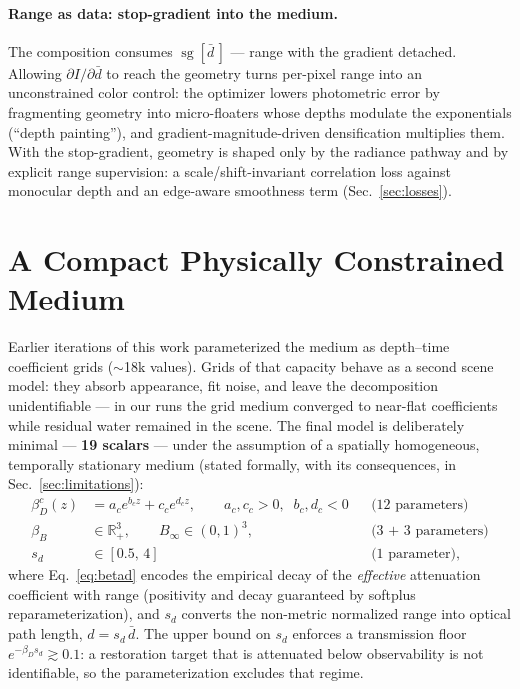 \documentclass[11pt,a4paper]{article}
\newcommand{\Binf}{B_\infty}
\newcommand{\I}{I}
\newcommand{\sg}{\operatorname{sg}}
\begin{document}
\paragraph{Range as data: stop-gradient into the medium.}
The composition consumes $\sg[\bar d\,]$ --- range with the gradient detached. Allowing $\partial \I / \partial \bar d$ to reach the geometry turns per-pixel range into an unconstrained color control: the optimizer lowers photometric error by fragmenting geometry into micro-floaters whose depths modulate the exponentials (``depth painting''), and gradient-magnitude-driven densification multiplies them. With the stop-gradient, geometry is shaped only by the radiance pathway and by explicit range supervision: a scale/shift-invariant correlation loss against monocular depth and an edge-aware smoothness term (Sec.~\ref{sec:losses}).

\section{A Compact Physically Constrained Medium}
\label{sec:medium-param}

Earlier iterations of this work parameterized the medium as depth--time coefficient grids ($\sim$18k values). Grids of that capacity behave as a second scene model: they absorb appearance, fit noise, and leave the decomposition unidentifiable --- in our runs the grid medium converged to near-flat coefficients while residual water remained in the scene. The final model is deliberately minimal --- \textbf{19 scalars} --- under the assumption of a spatially homogeneous, temporally stationary medium (stated formally, with its consequences, in Sec.~\ref{sec:limitations}):
\begin{align}
    \beta_D^c(z) &= a_c e^{b_c z} + c_c e^{d_c z},
    \qquad a_c, c_c > 0,\;\; b_c, d_c < 0
    && \text{(12 parameters)} \label{eq:betad}\\
    \beta_B &\in \mathbb{R}^3_{+},
    \qquad
    \Binf \in (0,1)^3,
    && \text{(3 + 3 parameters)}\\
    s_d &\in [0.5,\, 4]
    && \text{(1 parameter)},
\end{align}
where Eq.~\eqref{eq:betad} encodes the empirical decay of the \emph{effective} attenuation coefficient with range (positivity and decay guaranteed by softplus reparameterization), and $s_d$ converts the non-metric normalized range into optical path length, $d = s_d\,\bar d$. The upper bound on $s_d$ enforces a transmission floor $e^{-\beta_D s_d} \gtrsim 0.1$: a restoration target that is attenuated below observability is not identifiable, so the parameterization excludes that regime.
\end{document}

